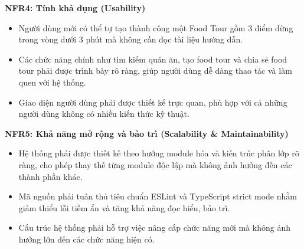 \textbf{NFR4: Tính khả dụng (Usability)} 
\begin{itemize}[label=\textbullet]
    \item Người dùng mới có thể tự tạo thành công một Food Tour gồm 3 điểm dừng trong vòng dưới
3 phút mà không cần đọc tài liệu hướng dẫn.
    \item Các chức năng chính như tìm kiếm quán ăn, tạo food tour và chia sẻ food tour phải được
trình bày rõ ràng, giúp người dùng dễ dàng thao tác và làm quen với hệ thống.
    \item Giao diện người dùng phải được thiết kế trực quan, phù hợp với cả những người dùng không
có nhiều kiến thức kỹ thuật.
\end{itemize}

\textbf{NFR5: Khả năng mở rộng và bảo trì (Scalability \& Maintainability)} 
\begin{itemize}[label=\textbullet]
    \item Hệ thống phải được thiết kế theo hướng module hóa và kiến trúc phân lớp rõ ràng, cho phép
thay thế từng module độc lập mà không ảnh hưởng đến các thành phần khác.
    \item Mã nguồn phải tuân thủ tiêu chuẩn ESLint và TypeScript strict mode nhằm giảm thiểu lỗi
tiềm ẩn và tăng khả năng đọc hiểu, bảo trì.
    \item Cấu trúc hệ thống phải hỗ trợ việc nâng cấp chức năng mới mà không ảnh hưởng lớn đến
các chức năng hiện có.
\end{itemize}
\cleardoublepage